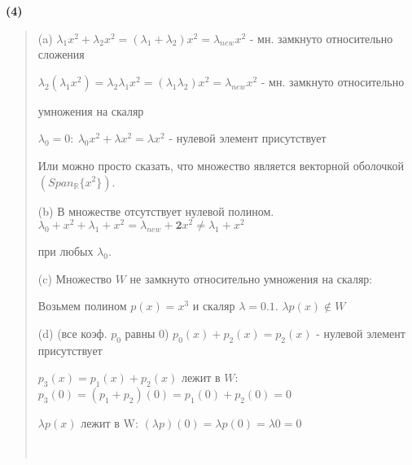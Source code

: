 \documentclass{article}
\begin{document}
\textsf{\textbf{(4)}}
\begin{quote}
(a) $\lambda_1 x^2 + \lambda_2 x^2 = (\lambda_1 + \lambda_2) x^2 = \lambda_{new} x^2$ - мн. замкнуто относительно сложения


\hspace{0.5cm} $\lambda_2 (\lambda_1 x^2) = \lambda_2 \lambda_1 x^2 = (\lambda_1 \lambda_2) x^2 = \lambda_{new} x^2$ - мн. замкнуто относительно

\hspace{0.5cm} умножения на скаляр

\hspace{0.5cm} $\lambda_0 = 0: \ \lambda_0 x^2 + \lambda x^2 = \lambda x^2$ - нулевой элемент присутствует

\hspace{0.5cm} Или можно просто сказать, что множество является векторной оболочкой $(Span_{\mathbb{R}}\{x^2\})$. 

\hspace{0.5cm} 

(b) В множестве отсутствует нулевой полином. $\lambda_0 + x^2 + \lambda_1 + x^2  = \lambda_{new} + \textbf{2}x^2 \not = \lambda_1 + x^2$ 

\hspace{0.5cm} при любых $\lambda_0$.

\hspace{0.5cm} 

(c) Множество $W$ не замкнуто относительно умножения на скаляр:

\hspace{0.5cm} Возьмем полином $p(x) = x^3$ и скаляр $\lambda = 0.1$. $\lambda p(x) \not \in W$

\hspace{0.5cm} 

(d) (все коэф. $p_0$ равны 0) $p_0(x) + p_2(x) = p_2(x)$ - нулевой элемент присутствует

\hspace{0.5cm} $p_3(x) = p_1(x) + p_2(x)$ лежит в $W$: $p_3(0) = (p_1 + p_2)(0) = p_1(0) + p_2(0) = 0$

\hspace{0.5cm} $\lambda p(x)$ лежит в W: $(\lambda p)(0) = \lambda p(0) = \lambda 0 = 0$

\hspace{0.5cm} \\
\end{quote}
\end{document}
